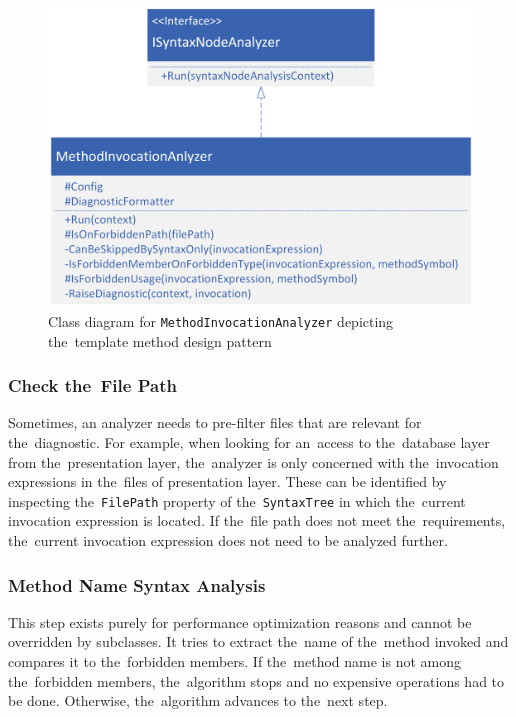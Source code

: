\documentclass[
  digital, %
  table,   %
  lof,     %
  lot,     %
  oneside,
]{fithesis3}
\begin{document}
\begin{figure}[h!]
		\centering
			\includegraphics[scale=0.85]{img/uml/method-invocation-analyzer}
		\caption{Class diagram for \texttt{MethodInvocationAnalyzer} depicting the~template method design pattern}
		\label{fig:uml-method-invocation-analyzer}
\end{figure}

\subsubsection{Check the~File Path}
Sometimes, an analyzer needs to pre-filter files that are relevant for the~diagnostic. For example, when looking for an~access to the~database layer from the~presentation layer, the~analyzer is only concerned with the~invocation expressions in the~files of presentation layer. These can be identified by inspecting the~\texttt{FilePath} property of the~\texttt{SyntaxTree} in which the~current invocation expression is located. If the~file path does not meet the~requirements, the~current invocation expression does not need to be analyzed further.

\subsubsection{Method Name Syntax Analysis}
This step exists purely for performance optimization reasons and cannot be overridden by subclasses. It tries to extract the~name of the~method invoked and compares it to the~forbidden members. If the~method name is not among the~forbidden members, the~algorithm stops and no expensive operations had to be done. Otherwise, the~algorithm advances to the~next step.
\end{document}
